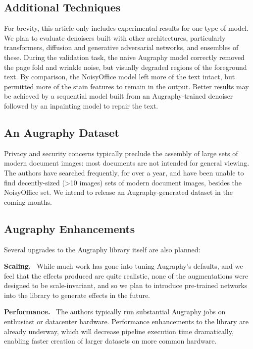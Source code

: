 \documentclass[runningheads]{llncs}
\begin{document}
\subsection{Additional Techniques}
For brevity, this article only includes experimental results for one type of model.
We plan to evaluate denoisers built with other architectures, particularly transformers, diffusion and generative adversarial networks, and ensembles of these.
During the validation task, the naive Augraphy model correctly removed the page fold and wrinkle noise, but visually degraded regions of the foreground text.
By comparison, the NoisyOffice model left more of the text intact, but permitted more of the stain features to remain in the output.
Better results may be achieved by a sequential model built from an Augraphy-trained denoiser followed by an inpainting model to repair the text.

\subsection{An Augraphy Dataset}
Privacy and security concerns typically preclude the assembly of large sets of modern document images: most documents are not intended for general viewing.
The authors have searched frequently, for over a year, and have been unable to find decently-sized (>10 images) sets of modern document images, besides the NoisyOffice set.
We intend to release an Augraphy-generated dataset in the coming months.

\subsection{Augraphy Enhancements}
Several upgrades to the Augraphy library itself are also planned:

\smallskip\noindent\textbf{Scaling.} ~While much work has gone into tuning Augraphy's defaults, and we feel that the effects produced are quite realistic, none of the augmentations were designed to be scale-invariant, and so we plan to introduce pre-trained networks into the library to generate effects in the future.

\smallskip\noindent\textbf{Performance.} ~The authors typically run substantial Augraphy jobs on enthusiast or datacenter hardware.
Performance enhancements to the library are already underway, which will decrease pipeline execution time dramatically, enabling faster creation of larger datasets on more common hardware.
\end{document}
